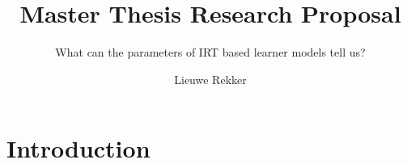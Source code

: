 \documentclass{scrartcl}
\providecommand{\comm}[1]{{\bf[ #1 ]}}
\providecommand{\commd}[1]{\comm{D: {#1}}}
\begin{document}
 
\title{Master Thesis Research Proposal}
\subtitle{What can the parameters of IRT based learner models tell us?}
\author{Lieuwe Rekker}
\maketitle
\nocite{labelcombi}
\nocite{lftransfer}
\nocite{importance}
\nocite{knowledgeproblem}
\nocite{modelreview}
\nocite{eirt}
\nocite{pfa}
\nocite{ktpfa}
\nocite{skillcombi}
\nocite{lfa}
\nocite{blackart}
\nocite{hambleton}


\section{Introduction}
\begin{comment}
Many current intelligent tutor systems (ITS) use learner models that can give indications of to what extent a student has mastered a particular skill and even how fast students learn.  The quality of these models is generally measured by how well these models predict 'one question into the future' performance, which is what these algorithms\commd{You didn't mention any algorithms yet, just models - and even then, they maximimize the likelihood of the training data...} are made to maximize. Parameter values from these models are also inspected and stated to represent students' knowledge levels, how fast students learn, how difficult questions are etc. It would thus be wise to inspect other factors beyond the accuracy of the model to gain some idea of under what conditions they actually convey some stable real world factor or are rather part of a more black-box like model that performs well on its prediction task, but whose parameters are otherwise meaningless. \cite{knowledgeproblem} shows that this is indeed a problem: widely differing parameter settings can yield similar, (near) optimal performances. This proposal proposes research to explore if parameters of learner models hold meaning in real life.

The approach of this research is from the perspective that models resemble reality, but are necessarily not precise mirrors of it. Initially generated data is used to see how well parameter values can be retrieved at all and to see what happens to parameters when there is a mismatch between model and 'reality' (i.e. training a model on data generated by a different model). The amount of training data is looked at especially, since even if stable parameter values can be found, this will probably break down at some point. In the case of real data, original parameters and models are unknown. Over multiple training runs on different data-sets, variation in parameter values can be inspected. High variation here indicates that (despite possible good prediction performance of the model as a whole) the parameter does not represent anything in reality.
\end{comment}
\end{document}
